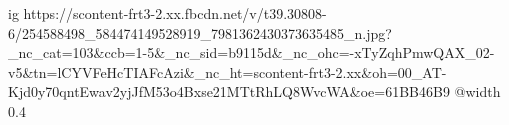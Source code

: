  
 
 
 
 

\ifcmt
  ig https://scontent-frt3-2.xx.fbcdn.net/v/t39.30808-6/254588498_584474149528919_7981362430373635485_n.jpg?_nc_cat=103&ccb=1-5&_nc_sid=b9115d&_nc_ohc=-xTyZqhPmwQAX_02-v5&tn=lCYVFeHcTIAFcAzi&_nc_ht=scontent-frt3-2.xx&oh=00_AT-Kjd0y70qntEwav2yjJfM53o4Bxse21MTtRhLQ8WvcWA&oe=61BB46B9
  @width 0.4
\fi
